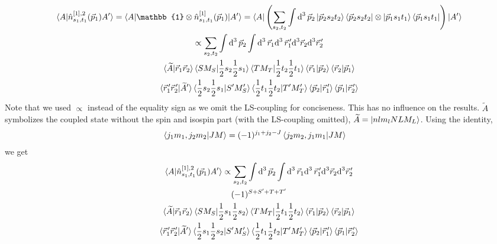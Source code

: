 \documentclass[10pt]{article}
\begin{document}
\begin{multline*}
	\braket{ A | \hat{n}^{[1],2}_{s_1,t_1}(\vec{p}_1) A'} = \braket{ A | \mathbb{1} \otimes \hat{n}^{[1]}_{s_1,t_1}(\vec{p}_1) | A'} = \bra{ A } \left( \sum_{s_2,t_2} \int \text{d}^{3} \, \vec{p}_{2} \ket{ \vec{p}_2 s_2 t_2} \bra{ \vec{p}_2 s_2 t_2} \otimes \ket{ \vec{p}_1 s_1 t_1} \bra{ \vec{p}_1 s_1 t_1} \right) \ket{ A' } \\
	\propto \sum_{s_2,t_2} \int \text{d}^{3} \, \vec{p}_{2} \int \text{d}^{3} \, \vec{r}_{1} \text{d}^{3} \, \vec{r}_{1}^{\,\prime} \text{d}^{3} \vec{r}_{2} \text{d}^{3} \vec{r}_{2}^{\,\prime} \\
	\braket{ \widetilde{A} | \vec{r}_{1} \vec{r}_{2}} \braket { S M_S | \frac{1}{2} s_2 \frac{1}{2} s_1 } \braket{ T M_T | \frac{1}{2} t_2 \frac{1}{2} t_1 } \braket{ \vec{r}_{1} | \vec{p}_{2} } \braket{ \vec{r}_{2} | \vec{p}_{1}} \\
	\braket{ \vec{r}_{1}^{\,\prime} \vec{r}_{2}^{\,\prime} | \widetilde{A}'} \braket{ \frac{1}{2} s_2 \frac{1}{2} s_1 | S' M_S'} \braket{ \frac{1}{2} t_1 \frac{1}{2} t_2 | T' M_T'} \braket{ \vec{p}_2 | \vec{r}_{1}^{\,\prime}} \braket{ \vec{p}_{1} | \vec{r}_{2}^{\,\prime}} \\
\end{multline*}
Note that we used $\propto$ instead of the equality sign as we omit the LS-coupling for conciseness. This has no influence on the results. $\widetilde{A}$ symbolizes the coupled state without the spin and isospin part (with the LS-coupling omitted), $\widetilde{A} = \ket{ n l m_l N L M_L}$.  Using the identity,
\begin{align*}
	\braket{ j_1 m_1, j_2 m_2 | J M } &= (-1)^{j_1 + j_2 - J} \braket{ j_2 m_2, j_1 m_1 | J M} 
\end{align*}
we get
\begin{multline*}
	\braket{ A | \hat{n}^{[1],2}_{s_1,t_1}(\vec{p}_1) A'}	\propto \sum_{s_2,t_2} \int \text{d}^{3} \, \vec{p}_{2} \int \text{d}^{3} \, \vec{r}_{1} \text{d}^{3} \, \vec{r}_{1}^{\,\prime} \text{d}^{3} \vec{r}_{2} \text{d}^{3} \vec{r}_{2}^{\,\prime} \\
	(-1)^{  S + S' + T + T'} \\
	\braket{ \widetilde{A} | \vec{r}_{1} \vec{r}_{2}} \braket { S M_S | \frac{1}{2} s_1 \frac{1}{2} s_2 } \braket{ T M_T | \frac{1}{2} t_1 \frac{1}{2} t_2 } \braket{ \vec{r}_{1} | \vec{p}_{2} } \braket{ \vec{r}_{2} | \vec{p}_{1}} \\
	\braket{ \vec{r}_{1}^{\,\prime} \vec{r}_{2}^{\,\prime} | \widetilde{A}'} \braket{ \frac{1}{2} s_1 \frac{1}{2} s_2 | S' M_S'} \braket{ \frac{1}{2} t_1 \frac{1}{2} t_2 | T' M_T'} \braket{ \vec{p}_2 | \vec{r}_{1}^{\,\prime}} \braket{ \vec{p}_{1} | \vec{r}_{2}^{\,\prime}} \\
\end{multline*}
\end{document}
